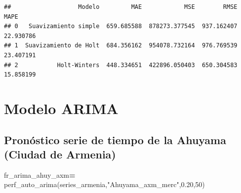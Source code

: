 \documentclass[
]{book}
\newenvironment{Shaded}{\begin{snugshade}}{\end{snugshade}}
\newcommand{\DecValTok}[1]{\textcolor[rgb]{0.00,0.00,0.81}{#1}}
\newcommand{\FloatTok}[1]{\textcolor[rgb]{0.00,0.00,0.81}{#1}}
\newcommand{\NormalTok}[1]{#1}
\newcommand{\OperatorTok}[1]{\textcolor[rgb]{0.81,0.36,0.00}{\textbf{#1}}}
\newcommand{\StringTok}[1]{\textcolor[rgb]{0.31,0.60,0.02}{#1}}
\begin{document}
\begin{verbatim}
##                   Modelo         MAE            MSE        RMSE       MAPE
## 0   Suavizamiento simple  659.685588  878273.377545  937.162407  22.930786
## 1  Suavizamiento de Holt  684.356162  954078.732164  976.769539  23.407191
## 2           Holt-Winters  448.334651  422896.050403  650.304583  15.858199
\end{verbatim}

\hypertarget{modelo-arima}{%
\section{Modelo ARIMA}\label{modelo-arima}}

\hypertarget{pronuxf3stico-serie-de-tiempo-de-la-ahuyama-ciudad-de-armenia-1}{%
\subsection{Pronóstico serie de tiempo de la Ahuyama (Ciudad de Armenia)}\label{pronuxf3stico-serie-de-tiempo-de-la-ahuyama-ciudad-de-armenia-1}}

\begin{Shaded}
\begin{Highlighting}[]

\NormalTok{fr\_arima\_ahuy\_axm}\OperatorTok{=}\NormalTok{ perf\_auto\_arima(series\_armenia,}\StringTok{"Ahuyama\_axm\_merc"}\NormalTok{,}\FloatTok{0.20}\NormalTok{,}\DecValTok{50}\NormalTok{)}
\end{Highlighting}
\end{Shaded}
\end{document}
